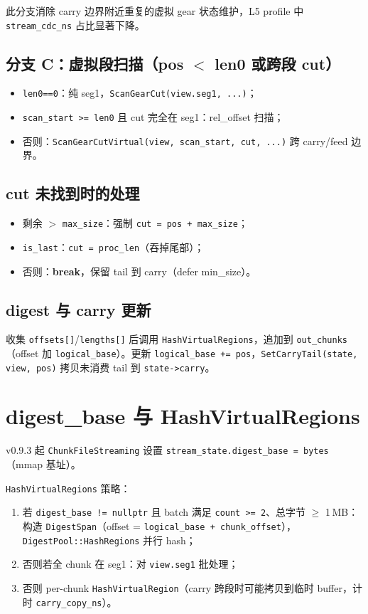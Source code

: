 此分支消除 carry 边界附近重复的虚拟 gear 状态维护，L5 profile 中 \texttt{stream\_cdc\_ns} 占比显著下降。

\subsection{分支 C：虚拟段扫描（pos $<$ len0 或跨段 cut）}

\begin{itemize}[nosep]
  \item \texttt{len0==0}：纯 seg1，\texttt{ScanGearCut(view.seg1, ...)}；
  \item \texttt{scan\_start >= len0} 且 cut 完全在 seg1：rel\_offset 扫描；
  \item 否则：\texttt{ScanGearCutVirtual(view, scan\_start, cut, ...)} 跨 carry/feed 边界。
\end{itemize}

\subsection{cut 未找到时的处理}

\begin{itemize}[nosep]
  \item 剩余 $>$ \texttt{max\_size}：强制 \texttt{cut = pos + max\_size}；
  \item \texttt{is\_last}：\texttt{cut = proc\_len}（吞掉尾部）；
  \item 否则：\textbf{break}，保留 tail 到 carry（defer min\_size）。
\end{itemize}

\subsection{digest 与 carry 更新}

收集 \texttt{offsets[]}/\texttt{lengths[]} 后调用 \texttt{HashVirtualRegions}，追加到 \texttt{out\_chunks}（offset 加 \texttt{logical\_base}）。更新 \texttt{logical\_base += pos}，\texttt{SetCarryTail(state, view, pos)} 拷贝未消费 tail 到 \texttt{state->carry}。

\section{digest\_base 与 HashVirtualRegions}

v0.9.3 起 \texttt{ChunkFileStreaming} 设置 \texttt{stream\_state.digest\_base = bytes}（mmap 基址）。

\texttt{HashVirtualRegions} 策略：
\begin{enumerate}
  \item 若 \texttt{digest\_base != nullptr} 且 batch 满足 \texttt{count >= 2}、总字节 $\geq$ 1\,MB：构造 \texttt{DigestSpan}（offset = \texttt{logical\_base + chunk\_offset}），\texttt{DigestPool::HashRegions} 并行 hash；
  \item 否则若全 chunk 在 seg1：对 \texttt{view.seg1} 批处理；
  \item 否则 per-chunk \texttt{HashVirtualRegion}（carry 跨段时可能拷贝到临时 buffer，计时 \texttt{carry\_copy\_ns}）。
\end{enumerate}

